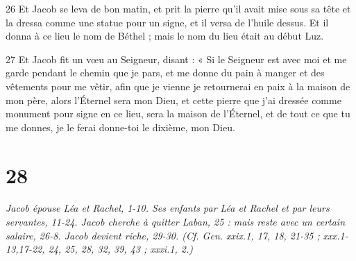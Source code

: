 \par 26 Et Jacob se leva de bon matin, et prit la pierre qu'il avait mise sous sa tête et la dressa comme une statue pour un signe, et il versa de l'huile dessus. Et il donna à ce lieu le nom de Béthel ; mais le nom du lieu était au début Luz.
\par 27 Et Jacob fit un vœu au Seigneur, disant : « Si le Seigneur est avec moi et me garde pendant le chemin que je pars, et me donne du pain à manger et des vêtements pour me vêtir, afin que je vienne je retournerai en paix à la maison de mon père, alors l'Éternel sera mon Dieu, et cette pierre que j'ai dressée comme monument pour signe en ce lieu, sera la maison de l'Éternel, et de tout ce que tu me donnes, je le ferai donne-toi le dixième, mon Dieu.

\chapter{28}

\par \textit{Jacob épouse Léa et Rachel, 1-10. Ses enfants par Léa et Rachel et par leurs servantes, 11-24. Jacob cherche à quitter Laban, 25 : mais reste avec un certain salaire, 26-8. Jacob devient riche, 29-30. (Cf. Gen. xxix.1, 17, 18, 21-35 ; xxx.1-13,17-22, 24, 25, 28, 32, 39, 43 ; xxxi.1, 2.)}

